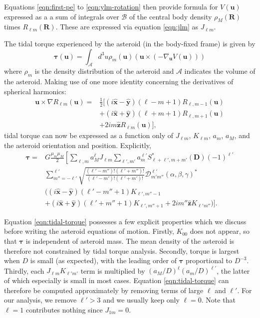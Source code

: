 \documentclass[fleqn,usenatbib]{mnras}
\newcommand{\unit}[1]{\bm{\hat{#1}}}
\begin{document}
Equations \ref{eqn:first-pe} to \ref{eqn:ylm-rotation} then provide formula for $V(\bm u)$ expressed as a a sum of integrals over $\mathcal{B}$ of the central body density $\rho_M(\bm R)$ times $R_{\ell m}(\bm R)$. These are expressed via equation \ref{eqn:jlm} as $J_{\ell m}$.

The tidal torque experienced by the asteroid (in the body-fixed frame) is given by
\begin{equation}
  \bm{\tau}(\bm u) = \int_\mathcal{A} d^3 u \rho_m(\bm u) (\bm u \times (-\nabla_{\bm u} V(\bm u)))
\end{equation}
where $\rho_m$ is the density distribution of the asteroid and $\mathcal{A}$ indicates the volume of the asteroid. Making use of one more identity concerning the derivatives of spherical harmonics:
\begin{equation}
  \begin{split}
  \bm u \times \nabla R_{\ell m}(\bm u)=&\frac{1}{2}\Big[(i\unit x - \unit y)(\ell-m+1)R_{\ell,m-1}(\bm u)\\
  &+(i\unit x+\unit y)(\ell+m+1)R_{\ell,m+1}(\bm u)\\
  & +2im\unit z R_{\ell m}(\bm u)\Big],
  \end{split}
\end{equation}
tidal torque can now be expressed as a function only of $J_{\ell m}$, $K_{\ell m}$, $a_m$, $a_M$, and the asteroid orientation and position. Explicitly,
\begin{equation}
  \begin{split}
  \bm \tau = &G\frac{\mu_m\mu_M}{2}\left[\sum_{\ell, m} a_M^\ell J_{\ell m} \sum_{\ell', m'}a_m^{\ell'}S^*_{\ell+\ell', m + m'} (\bm D) (-1)^{\ell'}\right.\\
  &\left.\sum_{m''=-\ell'}^{\ell'} \sqrt{\frac{(\ell'-m'')!(\ell'+m'')!}{(\ell'-m')!(\ell'+m')!}}  \mathcal{D}^{\ell'}_{m'm''}(\alpha, \beta, \gamma)^* \right. \\
  &\Big((i\unit x - \unit y)(\ell'-m''+1)K_{\ell',m''-1} \\
  &+(i\unit x+\unit y)(\ell'+m''+1)K_{\ell',m''+1}+2im''\unit z K_{\ell'm''}\Big) \Bigg].
  \end{split}
  \label{eqn:tidal-torque}
\end{equation}

Equation \ref{eqn:tidal-torque} possesses a few explicit properties which we discuss before writing the asteroid equations of motion. Firstly, $K_{00}$ does not appear, so that $\bm \tau$ is independent of asteroid mass. The mean density of the asteroid is therefore not constrained by tidal torque analysis. Secondly, torque is largest when $D$ is small (as expected), with the leading order of $\bm \tau$ proportional to $D^{-3}$. Thirdly, each $J_{\ell m}K_{\ell' m'}$ term is multiplied by $(a_M/D)^\ell (a_m/D)^{\ell'}$, the latter of which especially is small in most cases. Equation \ref{eqn:tidal-torque} can therefore be computed approximately by removing terms of large $\ell$ and $\ell'$. For our analysis, we remove $\ell' > 3$ and we usually keep only $\ell=0$. Note that $\ell=1$ contributes nothing since $J_{1m}=0$.
\end{document}
